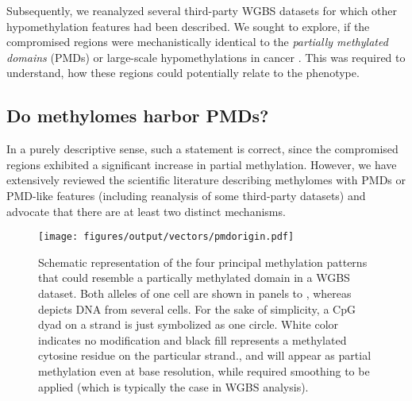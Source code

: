 Subsequently, we reanalyzed several third-party WGBS datasets for which other hypomethylation features had been described. We sought to explore, if the compromised regions were mechanistically identical to the \emph{partially methylated domains} (PMDs)\cite{Lister2009} or large-scale hypomethylations in cancer\cite{Timp2014} . This was required to understand, how these regions could potentially relate to the \dnmtchip phenotype. 

\subsection{Do \dnmtchipheadline methylomes harbor PMDs?}
\label{chap:d:methylation:cchippmds} %

In a purely descriptive sense, such a statement is correct, since the compromised regions exhibited a significant increase in partial methylation. However, we have extensively reviewed the scientific literature describing methylomes with PMDs or PMD-like features (including reanalysis of some third-party datasets) and advocate that there are at least two distinct mechanisms.   

\begin{figure}[!bht] 
	\centering
	\texttt{[image: figures/output/vectors/pmdorigin.pdf]} 
	\caption{Schematic representation of the four principal methylation patterns that could resemble a partically methylated domain in a WGBS dataset. Both alleles of one cell are shown in panels  to , whereas  depicts DNA from several cells. For the sake of simplicity, a CpG dyad on a strand is just symbolized as one circle. White color indicates no modification and black fill represents a methylated cytosine residue on the particular strand.,   and   will appear as partial methylation even at base resolution, while  required smoothing to be applied (which is typically the case in WGBS analysis\cite{Hansen2012,Wreczycka2017}).}
	\label{fig:pmdorigin}
\end{figure}

